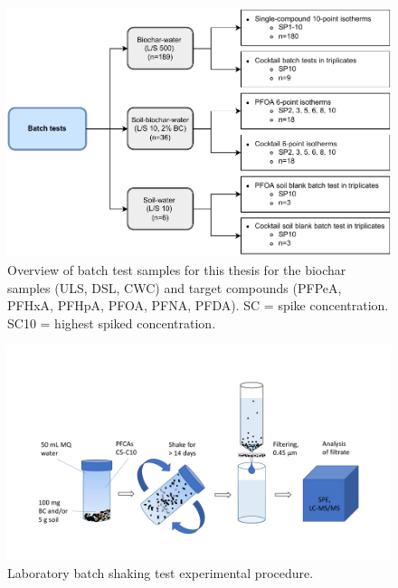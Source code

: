 \begin{figure}
    \centering
    \includegraphics{Diagrams/Methods-Page-9.pdf}
    \caption{Overview of batch test samples for this thesis for the biochar samples (\acrshort{ULS}, \acrshort{DSL}, \acrshort{CWC}) and target compounds (\acrshort{PFPeA}, \acrshort{PFHxA}, \acrshort{PFHpA}, \acrshort{PFOA}, \acrshort{PFNA}, \acrshort{PFDA}). \acrshort{SC} = spike concentration. SC10 = highest spiked concentration.}
    \label{fig:batchtests_flowchart}
\end{figure}

\begin{figure}
    \centering
    \includegraphics[width=\textwidth]{Diagrams/Batch_test.pdf}
    \caption{Laboratory batch shaking test experimental procedure.}
    \label{fig:batchtest_setup}
\end{figure}

